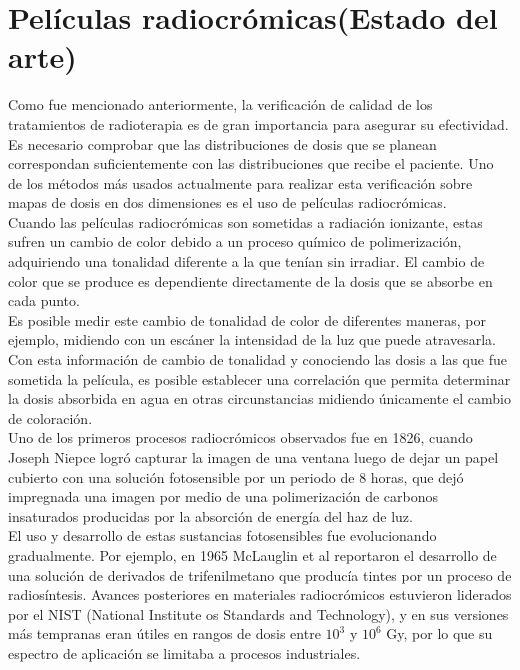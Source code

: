\section{Películas radiocrómicas(Estado del arte)}
Como fue mencionado anteriormente, la verificación de calidad de los tratamientos de radioterapia es de gran importancia para asegurar su efectividad. Es necesario comprobar que las distribuciones de dosis que se planean correspondan suficientemente con las distribuciones que recibe el paciente. Uno de los métodos más usados actualmente para realizar esta verificación sobre mapas de dosis en dos dimensiones es el uso de películas radiocrómicas.\\

Cuando las películas radiocrómicas son sometidas a radiación ionizante, estas sufren un cambio de color debido a un proceso químico de polimerización, adquiriendo una tonalidad diferente a la que tenían sin irradiar. El cambio de color que se produce es dependiente directamente de la dosis que se absorbe en cada punto. \\

Es posible medir este cambio de tonalidad de color de diferentes maneras, por ejemplo, midiendo con un escáner la intensidad de la luz que puede atravesarla. Con esta información de cambio de tonalidad y conociendo las dosis a las que fue sometida la película, es posible establecer una correlación que permita determinar la dosis absorbida en agua en otras circunstancias midiendo únicamente el cambio de coloración. \\

Uno de los primeros procesos radiocrómicos observados fue en 1826, cuando Joseph Niepce logró capturar la imagen de una ventana luego de dejar un papel cubierto con una solución fotosensible por un periodo de 8 horas, que dejó impregnada una imagen por medio de una polimerización de carbonos insaturados producidas por la absorción de energía del haz de luz.\\

El uso y desarrollo de estas sustancias fotosensibles fue evolucionando gradualmente. Por ejemplo, en 1965 McLauglin et al \cite{McLaughlin1965} reportaron el desarrollo de una solución de derivados de trifenilmetano que producía tintes por un proceso de radiosíntesis. Avances posteriores en materiales radiocrómicos estuvieron liderados por el NIST (National Institute os Standards and Technology), y en sus versiones más tempranas eran útiles en rangos de dosis entre $10^3$ y $10^6$ Gy, por lo que su espectro de aplicación se limitaba a procesos industriales\cite{Williams2011}.\\

